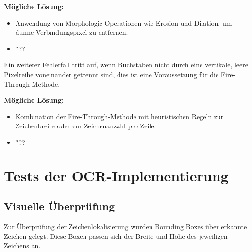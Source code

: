 


\textbf{Mögliche Lösung:} 
\begin{itemize}
    \item Anwendung von Morphologie-Operationen wie Erosion und Dilation, um dünne Verbindungspixel zu entfernen.
    \item ???
\end{itemize}


Ein weiterer Fehlerfall tritt auf, wenn Buchstaben nicht durch eine vertikale, leere Pixelreihe voneinander getrennt sind, dies ist eine Voraussetzung für die Fire-Through-Methode.


\textbf{Mögliche Lösung:}
\begin{itemize}
    \item Kombination der Fire-Through-Methode mit heuristischen Regeln zur Zeichenbreite oder zur Zeichenanzahl pro Zeile.
    \item ???
\end{itemize}


\section{Tests der OCR-Implementierung}

\subsection{Visuelle Überprüfung}

Zur Überprüfung der Zeichenlokalisierung wurden Bounding Boxes über erkannte Zeichen gelegt. Diese Boxen passen sich der Breite und Höhe des jeweiligen Zeichens an.


